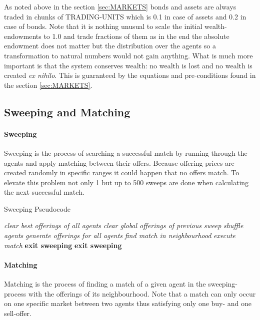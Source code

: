 \documentclass[Bachelorarbeit.tex]{subfiles}
\begin{document}
As noted above in the section \ref{sec:MARKETS} bonds and assets are always traded in chunks of TRADING-UNITS which is 0.1 in case of assets and 0.2 in case of bonds. Note that it is nothing unusual to scale the initial wealth-endowments to 1.0 and trade fractions of them as in the end the absolute endowment does not matter but the distribution over the agents so a transformation to natural numbers would not gain anything. What is much more important is that the system conserves wealth: no wealth is lost and no wealth is created \textit{ex nihilo}. This is guaranteed by the equations and pre-conditions found in the section \ref{sec:MARKETS}. 

\subsection{Sweeping and Matching}
\label{sec:implementation_sweepingAndMatching}

\paragraph{Sweeping}
Sweeping is the process of searching a successful match by running through the agents and apply matching between their offers. Because offering-prices are created randomly in specific ranges it could happen that no offers match. To elevate this problem not only 1 but up to 500 sweeps are done when calculating the next successful match.

\begin{algorithm}
\caption{Sweeping Pseudocode}\label{euclid}
\begin{algorithmic}[1]
\State \textit{clear best offerings of all agents}
	\State \textit{clear global offerings of previous sweep}
	\State \textit{shuffle agents}
	\State \textit{generate offerings for all agents}
		\State \textit{find match in neighbourhood}
			\State \textit{execute match}
			\State \textbf{exit sweeping}
		\EndIf 
	\EndFor
	\State \textbf{exit sweeping}
	\EndIf
\EndWhile
\end{algorithmic}
\end{algorithm}

\paragraph{Matching}
Matching is the process of finding a match of a given agent in the sweeping-process with the offerings of its neighbourhood. Note that a match can only occur on one specific market between two agents thus satisfying only one buy- and one sell-offer.
\end{document}
